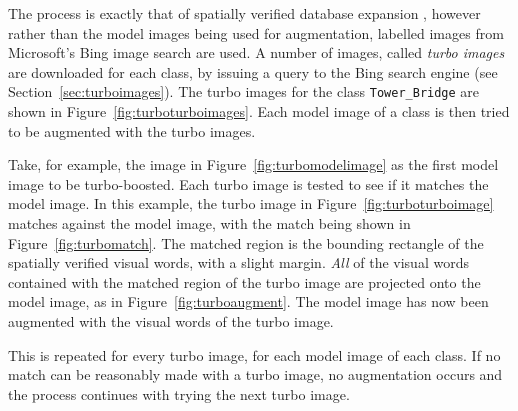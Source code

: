 \documentclass[11pt, onecolumn, a4paper, final]{report} %
\begin{document}
The process is exactly that of spatially verified database expansion \cite{rootsift12}, however rather than the model images being used for augmentation, labelled images from Microsoft's Bing image search are used. A number of images, called \emph{turbo images} are downloaded for each class, by issuing a query to the Bing search engine (see Section~\ref{sec:turboimages}). The turbo images for the class \lstinline!Tower_Bridge! are shown in Figure~\ref{fig:turboturboimages}. Each model image of a class is then tried to be augmented with the turbo images.

Take, for example, the image in Figure~\ref{fig:turbomodelimage} as the first model image to be turbo-boosted. Each turbo image is tested to see if it matches the model image. In this example, the turbo image in Figure~\ref{fig:turboturboimage} matches against the model image, with the match being shown in Figure~\ref{fig:turbomatch}. The matched region is the bounding rectangle of the spatially verified visual words, with a slight margin. \emph{All} of the visual words contained with the matched region of the turbo image are projected onto the model image, as in Figure~\ref{fig:turboaugment}. The model image has now been augmented with the visual words of the turbo image.

This is repeated for every turbo image, for each model image of each class. If no match can be reasonably made with a turbo image, no augmentation occurs and the process continues with trying the next turbo image.
\end{document}
